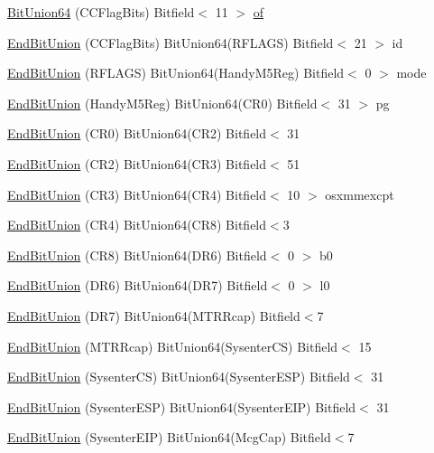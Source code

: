 \begin{DoxyCompactItemize}
\item 
\hyperlink{namespaceX86ISA_add2763aec7e48b7f1017b5fe13442001}{BitUnion64} (CCFlagBits) Bitfield$<$ 11 $>$ \hyperlink{namespaceX86ISA_a812166d5cea15560f9214ed7df90f800}{of}
\item 
\hyperlink{namespaceX86ISA_a5a5281caa3a9093cbf9cf11cd0707381}{EndBitUnion} (CCFlagBits) BitUnion64(RFLAGS) Bitfield$<$ 21 $>$ id
\item 
\hyperlink{namespaceX86ISA_ac07994f7a93f2a18d925d25590d4a9f6}{EndBitUnion} (RFLAGS) BitUnion64(HandyM5Reg) Bitfield$<$ 0 $>$ mode
\item 
\hyperlink{namespaceX86ISA_ad8865619d442f312bd5bab7adadf3d86}{EndBitUnion} (HandyM5Reg) BitUnion64(CR0) Bitfield$<$ 31 $>$ pg
\item 
\hyperlink{namespaceX86ISA_aad28ecf95b3da4ad6726c2b56e0fa95a}{EndBitUnion} (CR0) BitUnion64(CR2) Bitfield$<$ 31
\item 
\hyperlink{namespaceX86ISA_a6fb30c9c1ad6d18a04268626472a30d8}{EndBitUnion} (CR2) BitUnion64(CR3) Bitfield$<$ 51
\item 
\hyperlink{namespaceX86ISA_aaf77e09150e1b34a14d4f96e956c3f8c}{EndBitUnion} (CR3) BitUnion64(CR4) Bitfield$<$ 10 $>$ osxmmexcpt
\item 
\hyperlink{namespaceX86ISA_a7e4fd57e9e02956b923ac0120e86ea17}{EndBitUnion} (CR4) BitUnion64(CR8) Bitfield$<$3
\item 
\hyperlink{namespaceX86ISA_a4090a87d3d8e1fc8eef9350d8f1aaf5f}{EndBitUnion} (CR8) BitUnion64(DR6) Bitfield$<$ 0 $>$ b0
\item 
\hyperlink{namespaceX86ISA_aeeaa00abc970a64acc15c9cd060080d7}{EndBitUnion} (DR6) BitUnion64(DR7) Bitfield$<$ 0 $>$ l0
\item 
\hyperlink{namespaceX86ISA_a7aedb651d37934b8045347d6e6cc030e}{EndBitUnion} (DR7) BitUnion64(MTRRcap) Bitfield$<$7
\item 
\hyperlink{namespaceX86ISA_af2952321021f4fc6fbe7dac40d855d25}{EndBitUnion} (MTRRcap) BitUnion64(SysenterCS) Bitfield$<$ 15
\item 
\hyperlink{namespaceX86ISA_a43a50aa605aeac723bd1a4a2dc118e56}{EndBitUnion} (SysenterCS) BitUnion64(SysenterESP) Bitfield$<$ 31
\item 
\hyperlink{namespaceX86ISA_ab76cf8e722dcf9a853dc8ef123aeda8a}{EndBitUnion} (SysenterESP) BitUnion64(SysenterEIP) Bitfield$<$ 31
\item 
\hyperlink{namespaceX86ISA_a11cd84b3d92d7451d3a3d3c2a36d8763}{EndBitUnion} (SysenterEIP) BitUnion64(McgCap) Bitfield$<$7
\item 

\end{DoxyCompactItemize}
